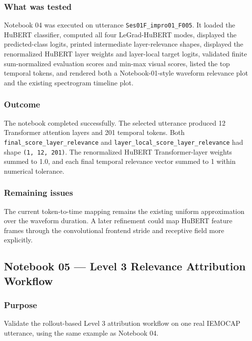 \documentclass[11pt]{article}
\begin{document}
\subsubsection*{What was tested}
Notebook 04 was executed on utterance \texttt{Ses01F\_impro01\_F005}. It loaded
the HuBERT classifier, computed all four LeGrad-HuBERT modes, displayed the
predicted-class logits, printed intermediate layer-relevance shapes, displayed
the renormalized HuBERT layer weights and layer-local target logits, validated
finite sum-normalized evaluation scores and min-max visual scores, listed the
top temporal tokens, and rendered both a Notebook-01-style waveform relevance
plot and the existing spectrogram timeline plot.

\subsubsection*{Outcome}
The notebook completed successfully. The selected utterance produced 12
Transformer attention layers and 201 temporal tokens. Both
\texttt{final\_score\_layer\_relevance} and
\texttt{layer\_local\_score\_layer\_relevance} had shape
\texttt{(1, 12, 201)}. The renormalized HuBERT Transformer-layer weights summed
to 1.0, and each final temporal relevance vector summed to 1 within numerical
tolerance.

\subsubsection*{Remaining issues}
The current token-to-time mapping remains the existing uniform approximation
over the waveform duration. A later refinement could map HuBERT feature frames
through the convolutional frontend stride and receptive field more explicitly.

\subsection{Notebook 05 --- Level 3 Relevance Attribution Workflow}

\subsubsection*{Purpose}
Validate the rollout-based Level 3 attribution workflow on one real IEMOCAP
utterance, using the same example as Notebook 04.
\end{document}
